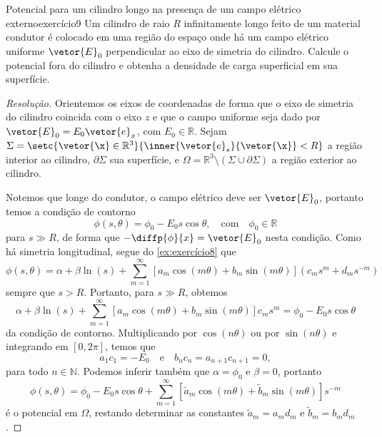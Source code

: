 \begin{exercício}{Potencial para um cilindro longo na presença de um campo elétrico externo}{exercício9}
    Um cilindro de raio \(R\) infinitamente longo feito de um material condutor é colocado em uma região do espaço onde há um campo elétrico uniforme \(\vetor{E}_0\) perpendicular ao eixo de simetria do cilindro. Calcule o potencial fora do cilindro e obtenha a densidade de carga superficial em sua superfície.
\end{exercício}
\begin{proof}[Resolução]
    Orientemos os eixos de coordenadas de forma que o eixo de simetria do cilindro coincida com o eixo \(z\) e que o campo uniforme seja dado por \(\vetor{E}_0 = E_0\vetor{e}_x\), com \(E_0 \in \mathbb{R}\). Sejam \(\Sigma = \setc{\vetor{\x} \in \mathbb{R}^3}{\inner{\vetor{e}_s}{\vetor{\x}} < R}\) a região interior ao cilindro, \(\partial \Sigma\) sua superfície, e \(\Omega = \mathbb{R}^3 \setminus (\Sigma \cup \partial \Sigma)\) a região exterior ao cilindro.

    Notemos que longe do condutor, o campo elétrico deve ser \(\vetor{E}_0\), portanto temos a condição de contorno
    \begin{equation*}
        \phi(s, \theta) = \phi_0 - E_0 s\cos\theta, \quad\text{com}\quad \phi_0 \in \mathbb{R}
    \end{equation*}
    para \(s \gg R\), de forma que \(-\diffp{\phi}{x} = \vetor{E}_0\) nesta condição. Como há simetria longitudinal, segue do \cref{ex:exercício8} que
    \begin{equation*}
        \phi(s, \theta) = \alpha + \beta \ln(s) + \sum_{m=1}^\infty \left[a_m \cos(m\theta) + b_m \sin(m\theta)\right](c_m s^m + d_m s^{-m})
    \end{equation*}
    sempre que \(s > R\). Portanto, para \(s \gg R\), obtemos
    \begin{equation*}
        \alpha + \beta \ln(s) + \sum_{m=1}^\infty \left[a_m \cos(m\theta) + b_m \sin(m\theta)\right]c_m s^m = \phi_0 - E_0 s\cos\theta
    \end{equation*}
    da condição de contorno. Multiplicando por \(\cos(n\theta)\) ou por \(\sin(n\theta)\) e integrando em \([0,2\pi]\), temos que
    \begin{equation*}
        a_1c_1 = -E_0
        \quad\text{e}\quad
        b_nc_n = a_{n+1}c_{n+1} = 0,
    \end{equation*}
    para todo \(n \in \mathbb{N}\). Podemos inferir também que \(\alpha = \phi_0\) e \(\beta = 0\), portanto
    \begin{equation*}
        \phi(s, \theta) = \phi_0 - E_0s \cos\theta + \sum_{m = 1}^\infty \left[\tilde{a}_m \cos(m\theta) + \tilde{b}_m\sin(m\theta)\right]s^{-m}
    \end{equation*}
    é o potencial em \(\Omega\), restando determinar as constantes \(\tilde{a}_m = a_m d_m\) e \(\tilde{b}_m = b_m d_m\).


\end{proof}
